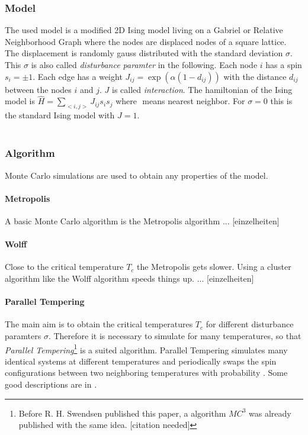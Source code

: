     \subsubsection{Model}
        The used model is a modified 2D Ising model living on a Gabriel
        or Relative Neighborhood Graph where the nodes are displaced
        nodes of a square lattice. The displacement is randomly gauss
        distributed with the standard deviation \(\sigma\). This
        \(\sigma\) is also called \emph{disturbance paramter} in the
        following.
        Each node \(i\) has a spin \(s_i = \pm 1\). Each edge has a
        weight \(J_{ij} = \exp (\alpha (1-d_{ij}))\) with the distance
        \(d_{ij}\) between the nodes \(i\) and \(j\). \(J\) is called
        \emph{interaction}. The hamiltonian of the Ising model is
        \(\hat{H} = \sum_{<i,j>}J_{ij}s_{i}s_{j}\)
        where \(<i,j>\) means nearest neighbor.
        For \(\sigma = 0\) this is the standard Ising model with
        \(J = 1\).\\\\

    \subsubsection{Algorithm}
        Monte Carlo simulations are used to obtain any properties of the
        model.
        \paragraph{Metropolis}
            A basic Monte Carlo algorithm is the Metropolis algorithm
            \cite{Metropolis1953} ... [einzelheiten]
        \paragraph{Wolff}
            Close to the critical temperature \(T_c\) the Metropolis
            gets slower. Using a cluster algorithm like the Wolff
            algorithm \cite{Wolff1989} speeds things up.
            ... [einzelheiten]
        \paragraph{Parallel Tempering}
            The main aim is to obtain the critical temperatures
            \(T_c\) for different disturbance paramters \(\sigma\).
            Therefore it is necessary to simulate for many temperatures,
            so that \emph{Parallel Tempering}\footnote{Before R. H.
                Swendsen published this paper, a algorithm \(MC^3\) was
                already published with the same idea. [citation needed]}
            \cite{ParallelTempering1986} is a suited algorithm. Parallel
            Tempering simulates many identical systems at different
            temperatures and periodically swaps the spin configurations
            between two neighboring temperatures with probability
            \(\). Some good descriptions are in
            \cite[S. ??]{NewmanBarkema1999} \cite[S. 155ff]{Katzgraber2011}.
